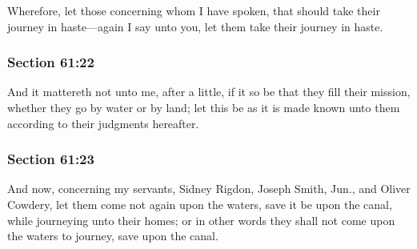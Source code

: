 		Wherefore, let those concerning whom I have spoken, that should take their journey in haste---again I say unto you, let them take their journey in haste.


	\subsubsection{Section 61:22} %
		\label{DC61-22}

		And it mattereth not unto me, after a little, if it so be that they fill their mission, whether they go by water or by land; let this be as it is made known unto them according to their judgments hereafter.


	\subsubsection{Section 61:23} %
		\label{DC61-23}

		And now, concerning my servants, Sidney Rigdon, Joseph Smith, Jun., and Oliver Cowdery, let them come not again upon the waters, save it be upon the canal, while journeying unto their homes; or in other words they shall not come upon the waters to journey, save upon the canal.


